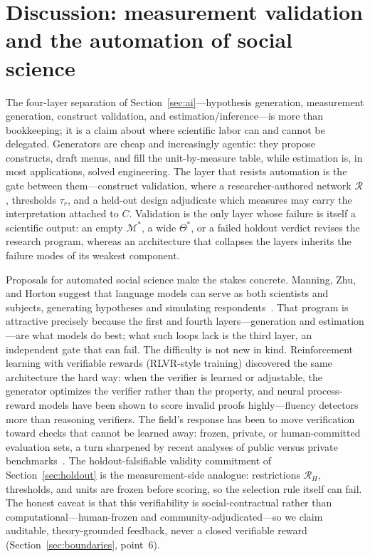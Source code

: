 \documentclass[10pt,letterpaper]{article}
\newcommand{\M}{\ensuremath{\mathcal{M}}}
\newcommand{\Rset}{\mathcal{R}}
\begin{document}
\section{Discussion: measurement validation and the automation of social science}
\label{sec:discussion}
The four-layer separation of Section~\ref{sec:ai}---hypothesis generation, measurement generation, construct validation, and estimation/inference---is more than bookkeeping; it is a claim about where scientific labor can and cannot be delegated.
Generators are cheap and increasingly agentic: they propose constructs, draft menus, and fill the unit-by-measure table, while estimation is, in most applications, solved engineering.
The layer that resists automation is the gate between them---construct validation, where a researcher-authored network $\Rset$, thresholds $\tau_r$, and a held-out design adjudicate which measures may carry the interpretation attached to $C$.
Validation is the only layer whose failure is itself a scientific output: an empty $\M^*$, a wide $\Theta^*$, or a failed holdout verdict revises the research program, whereas an architecture that collapses the layers inherits the failure modes of its weakest component.

Proposals for automated social science make the stakes concrete.
Manning, Zhu, and Horton suggest that language models can serve as both scientists and subjects, generating hypotheses and simulating respondents~\cite{manning2024}.
That program is attractive precisely because the first and fourth layers---generation and estimation---are what models do best; what such loops lack is the third layer, an independent gate that can fail.
The difficulty is not new in kind.
Reinforcement learning with verifiable rewards (RLVR-style training) discovered the same architecture the hard way: when the verifier is learned or adjustable, the generator optimizes the verifier rather than the property, and neural process-reward models have been shown to score invalid proofs highly---fluency detectors more than reasoning verifiers.
The field's response has been to move verification toward checks that cannot be learned away: frozen, private, or human-committed evaluation sets, a turn sharpened by recent analyses of public versus private benchmarks~\cite{truong2026}.
The holdout-falsifiable validity commitment of Section~\ref{sec:holdout} is the measurement-side analogue: restrictions $\Rset_H$, thresholds, and units are frozen before scoring, so the selection rule itself can fail.
The honest caveat is that this verifiability is social-contractual rather than computational---human-frozen and community-adjudicated---so we claim auditable, theory-grounded feedback, never a closed verifiable reward (Section~\ref{sec:boundaries}, point~6).
\end{document}
